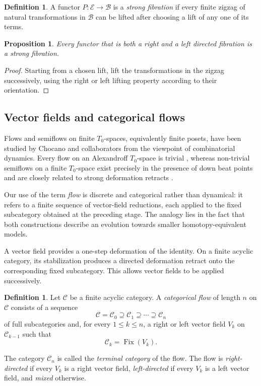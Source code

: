 \documentclass[12pt]{amsart}
\newtheorem{proposition}[teo]{Proposition}
\theoremstyle{definition}
\newtheorem{definition}[teo]{Definition}
\theoremstyle{remark}
\numberwithin{figure}{section}%
\newcommand{\Ba}{\mathcal{B}}
\newcommand{\CC}{\mathcal{C}}
\newcommand{\E}{\mathcal{E}}
\begin{document}
\begin{definition}\label{def:strong_fibration_recall}
A functor \(P\colon\E\to\Ba\) is a \emph{strong fibration} if every finite
zigzag of natural transformations in \(\Ba\) can be lifted after choosing
a lift of any one of its terms.
\end{definition}

\begin{proposition}\label{prop:bifibration_strong_fibration}
Every functor that is both a right and a left directed fibration is a
strong fibration.
\end{proposition}

\begin{proof}
Starting from a chosen lift, lift the transformations in the zigzag
successively, using the right or left lifting property according to their
orientation.
\end{proof}

\subsection{Vector fields and categorical flows}
\label{subsec:categorical_flows}
Flows and semiflows on finite \(T_0\)-spaces, equivalently finite
posets, have been studied by Chocano and collaborators from the
viewpoint of combinatorial dynamics. Every flow on an Alexandroff
\(T_0\)-space is trivial
\cite{ChocanoFlowsAlexandroff}, whereas non-trivial semiflows on a
finite \(T_0\)-space exist precisely in the presence of down beat
points and are closely related to strong deformation retracts
\cite{ChocanoSemiflows}.

Our use of the term \emph{flow} is discrete and categorical rather than
dynamical: it refers to a finite sequence of vector-field reductions,
each applied to the fixed subcategory obtained at the preceding stage.
The analogy lies in the fact that both constructions describe an
evolution towards smaller homotopy-equivalent models.

A vector field provides a one-step deformation of the identity. On a
finite acyclic category, its stabilization produces a directed
deformation retract onto the corresponding fixed subcategory. This
allows vector fields to be applied successively.
\begin{definition}\label{def:categorical_flow}
Let \(\CC\) be a finite acyclic category. A \emph{categorical flow} of
length \(n\) on \(\CC\) consists of a sequence
\[
\CC=\CC_0
\supseteq
\CC_1
\supseteq
\cdots
\supseteq
\CC_n
\]
of full subcategories and, for every \(1\leq k\leq n\), a right or left
vector field \(V_k\) on \(\CC_{k-1}\) such that
\[
\CC_k=\operatorname{Fix}(V_k).
\]

The category \(\CC_n\) is called the \emph{terminal category} of the
flow. The flow is \emph{right-directed} if every \(V_k\) is a right
vector field, \emph{left-directed} if every \(V_k\) is a left vector
field, and \emph{mixed} otherwise.
\end{definition}
\end{document}
